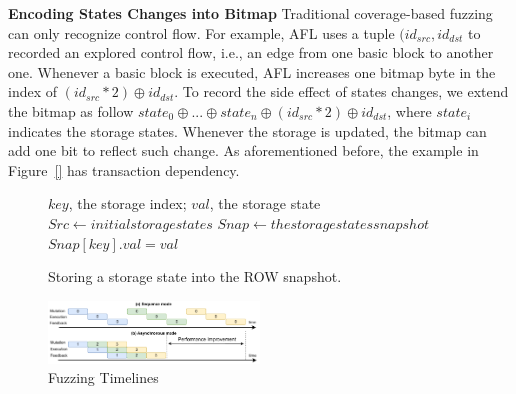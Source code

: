 \noindent \textbf{Encoding States Changes into Bitmap}
Traditional coverage-based fuzzing can only recognize control flow. For example, AFL uses a tuple $(id_{src}, id_{dst}$ to recorded an explored control flow, i.e., an edge from one basic block to another one. Whenever a basic block is executed, AFL increases one bitmap byte in the index of $(id_{src} * 2) \oplus id_{dst}$. 
To record the side effect of states changes, we extend the bitmap as follow $state_0 \oplus ... \oplus state_n \oplus (id_{src} * 2) \oplus id_{dst}$, where $state_i$ indicates the storage states. 
Whenever the storage is updated, the bitmap can add one bit to reflect such change. 
As aforementioned before, the example in Figure~\ref{} has transaction dependency.  



\begin{figure}[t]
\begin{algorithm}[H]
\caption{Storing a storage state into the ROW snapshot.}
\label{algo:row_sstore}
\begin{algorithmic}[1]
    \Require $key$, the storage index; $val$, the storage state
    \State $Src \gets initial storage states$
    \State $Snap \gets the storage states snapshot$
        \State $Snap[key].val = val$
        \State \Return
    \EndIf
\end{algorithmic}
\end{algorithm}
\end{figure}


\begin{figure}[t]
\centerline{\includegraphics[width=0.5\textwidth]{images/GFL-async_cpy.drawio.pdf}}
\caption{Fuzzing Timelines}
\vspace{-0.1in}
\label{fig:async_cpy}
\end{figure}

